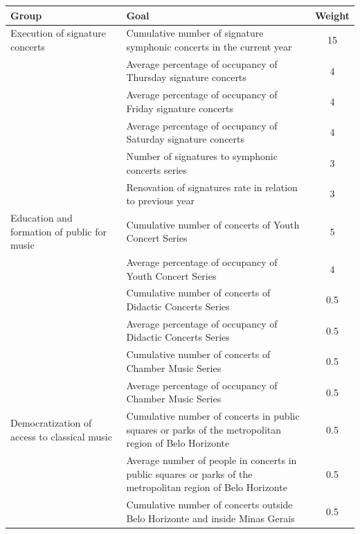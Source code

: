 \documentclass[a4paper, 12pt, openright, oneside, german, french, brazil, english]{abntex2}
\begin{document}
        \begin{table}[!h]
          {\begin{tabular}{p{6cm} p{7cm} c}
             \hline
             \textbf{Group}  & \textbf{Goal} & \textbf{Weight} \\
             \hline
             Execution of signature concerts & Cumulative number of signature symphonic concerts in the current year & 15 \\
                             & Average percentage of occupancy of Thursday signature concerts & 4 \\
                             & Average percentage of occupancy of Friday signature concerts & 4 \\
                             & Average percentage of occupancy of Saturday signature concerts & 4 \\
                             & Number of signatures to symphonic concerts series & 3 \\
                             & Renovation of signatures rate in relation to previous year & 3 \\
             \hline
             Education and formation of public for music & Cumulative number of concerts of Youth Concert Series & 5 \\
                             & Average percentage of occupancy of Youth Concert Series & 4 \\
                             & Cumulative number of concerts of Didactic Concerts Series & 0.5 \\
                             & Average percentage of occupancy of Didactic Concerts Series & 0.5 \\
                             & Cumulative number of concerts of Chamber Music Series & 0.5 \\
                             & Average percentage of occupancy of Chamber Music Series & 0.5 \\
             \hline
             Democratization of access to classical music & Cumulative number of concerts in public squares or parks of the metropolitan region of Belo Horizonte & 0.5 \\
                             & Average number of people in concerts in public squares or parks of the metropolitan region of Belo Horizonte & 0.5 \\
                             & Cumulative number of concerts outside Belo Horizonte and inside Minas Gerais & 0.5 \\

\end{tabular}}
\end{table}
\end{document}
